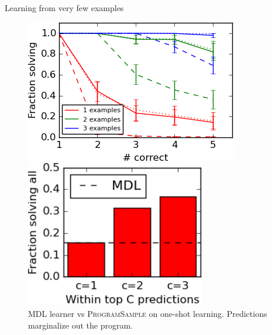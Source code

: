 \documentclass[final]{beamer}
\newlength{\onecolwid}
\newlength{\twocolwid}
\newcommand{\theSystem}{\textsc{ProgramSample}}
\begin{document}
\begin{frame}[t]
\begin{columns}[t]
\begin{column}{\twocolwid}
\begin{columns}[t,totalwidth=\twocolwid]
\begin{column}{\onecolwid}
\begin{block}{Learning from very few examples}
\begin{figure}[h]\centering
  \begin{minipage}{0.45\textwidth}\centering
    \includegraphics[width=\textwidth]{smallFractionSolving.png}
  \caption{Results averaged across 19 problems. Solid: \theSystem{} . Dashed: enumerating 100 programs. Dotted: MDL.}\label{flashPerformance}        \end{minipage}%
\hspace{0.025\textwidth}\begin{minipage}{0.45\textwidth}\centering
    \includegraphics[width=0.7\textwidth]{small_mdl.png}
    \caption{MDL learner vs \theSystem{} on one-shot learning. Predictions marginalize out the program.}\label{mdl}
  \end{minipage}
\end{figure}



\end{block}
\end{column}
\end{columns}
\end{column}
\end{columns}
\end{frame}
\end{document}

